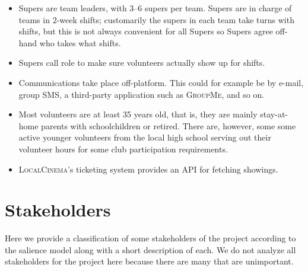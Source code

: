 \begin{itemize}
	\item Supers are team leaders, with 3--6 supers per team.
	      Supers are in charge of teams in 2-week shifts;
	      customarily the supers in each team take turns with shifts,
	      but this is not always convenient for all Supers
	      so Supers agree off-hand who takes what shifts.

	\item Supers call role to make sure volunteers actually show up for shifts.

	\item Communications take place off-platform.
	      This could for example be by e-mail, group SMS,
	      a third-party application such as \textsc{GroupMe},
	      and so on.

	\item Most volunteers are at least 35 years old,
	      that is, they are mainly stay-at-home parents with schoolchildren or retired.
	      There are, however, some some active younger volunteers from the local high school
	      serving out their volunteer hours for some club participation requirements.

	\item \textsc{LocalCinema}'s ticketing system
	      provides an API for fetching showings.
\end{itemize}

\section*{Stakeholders}

Here we provide a classification of some stakeholders of the project
according to the salience model
along with a short description of each.
We do not analyze all stakeholders for the project here
because there are many that are unimportant.

\medskip

